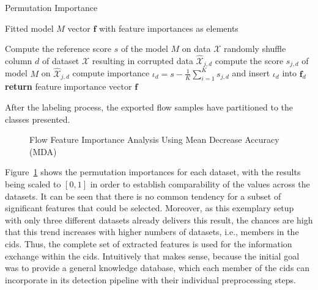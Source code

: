 \documentclass[../../main.tex]{subfiles}
\begin{document}
\begin{algorithm}
    \caption{Permutation Importance}
    \label{alg:permutation_importance}
    \begin{algorithmic}[1]
        \REQUIRE Fitted model $M$
        \ENSURE vector $\bm{f}$ with feature importances as elements

        \STATE Compute the reference score $s$ of the model $M$ on data $\mathcal{X}$
                \STATE randomly shuffle column $d$ of dataset $\mathcal{X}$ resulting in corrupted data $\hat{\mathcal{X}}_{j,d}$
                \STATE compute the score $s_{j,d}$ of model $M$ on $\hat{\mathcal{X}}_{j,d}$
            \ENDFOR
            \STATE compute importance $\iota_d = s - \frac{1}{K} \sum\limits^K_{i=1} s_{j,d}$ and insert $\iota_d$ into $\bm{f}_d$
        \ENDFOR
        \STATE \textbf{return} feature importance vector $\bm{f}$
    \end{algorithmic}
 \end{algorithm}

 \begin{table}[t]
    \footnotesize
    \centering
    \setlength{\extrarowheight}{0pt}
    \addtolength{\extrarowheight}{\aboverulesep}
    \addtolength{\extrarowheight}{\belowrulesep}
    \setlength{\aboverulesep}{0pt}
    \setlength{\belowrulesep}{0pt}
    \setlength{\extrarowheight}{.1em}
     
    \caption[Preprocessed Flows]{After the labeling process, the exported flow samples have partitioned to the classes presented.}
    \label{tab:preprocessed_flows}
\end{table}

\begin{figure}[t]
    \centering
    
    \caption[Flow Feature Importance Analysis]{Flow Feature Importance Analysis Using Mean Decrease Accuracy (MDA)}
    \label{fig:feature_importances}
\end{figure}
Figure~\ref{fig:feature_importances} shows the permutation importances for each dataset, with the results being scaled to $[0,1]$ in order to establish comparability of the values across the datasets. It can be seen that there is no common tendency for a subset of significant features that could be selected. Moreover, as this exemplary setup with only three different datasets already delivers this result, the chances are high that this trend increases with higher numbers of datasets, i.e., members in the \gls{cids}. Thus, the complete set of extracted features is used for the information exchange within the \gls{cids}. Intuitively that makes sense, because the initial goal was to provide a general knowledge database, which each member of the \gls{cids} can incorporate in its detection pipeline with their individual preprocessing steps.
\end{document}
